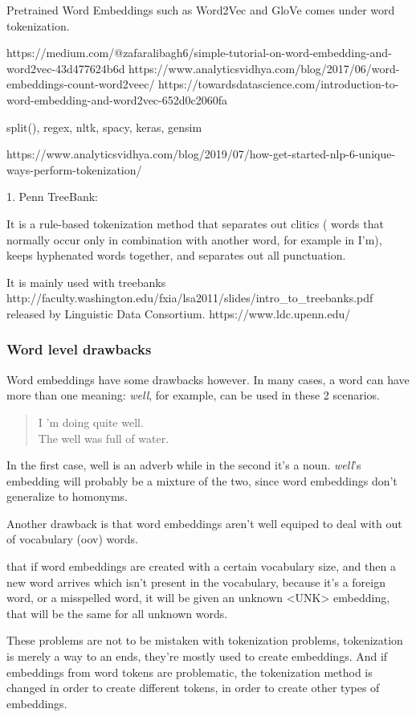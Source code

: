 Pretrained Word Embeddings such as Word2Vec and GloVe comes under word tokenization.

https://medium.com/@zafaralibagh6/simple-tutorial-on-word-embedding-and-word2vec-43d477624b6d
https://www.analyticsvidhya.com/blog/2017/06/word-embeddings-count-word2veec/
https://towardsdatascience.com/introduction-to-word-embedding-and-word2vec-652d0c2060fa

split(), regex, nltk, spacy, keras, gensim

https://www.analyticsvidhya.com/blog/2019/07/how-get-started-nlp-6-unique-ways-perform-tokenization/

1. Penn TreeBank:

It is a rule-based tokenization method that separates out clitics ( words that normally occur only in combination with another word, for example in I’m), keeps hyphenated words together, and separates out all punctuation.

It is mainly used with treebanks http://faculty.washington.edu/fxia/lsa2011/slides/intro\_to\_treebanks.pdf released by Linguistic Data Consortium. https://www.ldc.upenn.edu/

\subsubsection{Word level drawbacks}

Word embeddings have some drawbacks however. In many cases, a word can have more than one meaning: \emph{well}, for example, can be used in these 2 scenarios.

\begin{quote}
    I 'm doing quite well.\\
    The well was full of water.
\end{quote}

In the first case, well is an adverb while in the second it's a noun. \emph{well}'s embedding will probably be a mixture of the two, since word embeddings don't generalize to homonyms.

Another drawback is that word embeddings aren't well equiped to deal with out of vocabulary (oov) words.

that if word embeddings are created with a certain vocabulary size, and then a new word arrives which isn't present in the vocabulary, because it's a foreign word, or a misspelled word, it will be given an unknown <UNK> embedding, that will be the same for all unknown words.

These problems are not to be mistaken with tokenization problems, tokenization is merely a way to an ends, they're mostly used to create embeddings. And if embeddings from word tokens are problematic, the tokenization method is changed in order to create different tokens, in order to create other types of embeddings.


